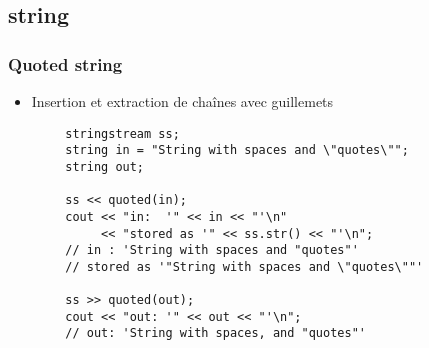 \documentclass[C++.tex]{subfiles}
\begin{document}
\subsection*{string}
\begin{frame}[fragile]
	\frametitle{Quoted string}
	\begin{itemize}
		\item Insertion et extraction de chaînes avec guillemets
	\end{itemize}

	\begin{verbatim}
		stringstream ss;
		string in = "String with spaces and \"quotes\"";
		string out;

		ss << quoted(in);
		cout << "in:  '" << in << "'\n"
		     << "stored as '" << ss.str() << "'\n";
		// in : 'String with spaces and "quotes"'
		// stored as '"String with spaces and \"quotes\""'

		ss >> quoted(out);
		cout << "out: '" << out << "'\n";
		// out: 'String with spaces, and "quotes"'
	\end{verbatim}



\end{frame}
\end{document}
